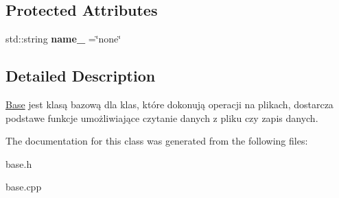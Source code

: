 \subsection*{Protected Attributes}
\begin{DoxyCompactItemize}
\item 
\mbox{\label{class_base_ace990b7abe15279f1bcf958f3a1f0d6b}} 
std\+::string {\bfseries name\+\_\+} =\char`\"{}none\char`\"{}
\end{DoxyCompactItemize}


\subsection{Detailed Description}
\mbox{\hyperlink{class_base}{Base}} jest klasą bazową dla klas, które dokonują operacji na plikach, dostarcza podstawe funkcje umożliwiające czytanie danych z pliku czy zapis danych. 

The documentation for this class was generated from the following files\+:\begin{DoxyCompactItemize}
\item 
base.\+h\item 
base.\+cpp\end{DoxyCompactItemize}
